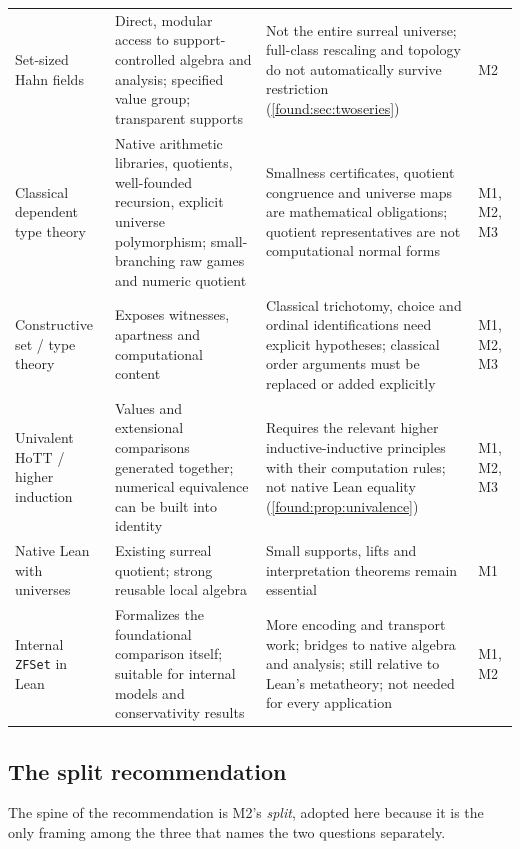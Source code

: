 \documentclass[11pt,letterpaper]{article}
\numberwithin{equation}{section}
\theoremstyle{definition}
\theoremstyle{remark}
\begin{document}
\begin{longtable}{@{}P{0.17\textwidth}P{0.30\textwidth}P{0.34\textwidth}P{0.10\textwidth}@{}}
Set-sized Hahn fields & Direct, modular access to support-controlled algebra and analysis; specified value group; transparent supports & Not the entire surreal universe; full-class rescaling and topology do not automatically survive restriction (\cref{found:sec:twoseries}) & M2\\[0.5em]
Classical dependent type theory & Native arithmetic libraries, quotients, well-founded recursion, explicit universe polymorphism; small-branching raw games and numeric quotient & Smallness certificates, quotient congruence and universe maps are mathematical obligations; quotient representatives are not computational normal forms & M1, M2, M3\\[0.5em]
Constructive set / type theory & Exposes witnesses, apartness and computational content & Classical trichotomy, choice and ordinal identifications need explicit hypotheses; classical order arguments must be replaced or added explicitly & M1, M2, M3\\[0.5em]
Univalent HoTT / higher induction & Values and extensional comparisons generated together; numerical equivalence can be built into identity & Requires the relevant higher inductive-inductive principles with their computation rules; not native Lean equality (\cref{found:prop:univalence}) & M1, M2, M3\\[0.5em]
Native Lean with universes & Existing surreal quotient; strong reusable local algebra & Small supports, lifts and interpretation theorems remain essential & M1\\[0.5em]
Internal \texttt{ZFSet} in Lean & Formalizes the foundational comparison itself; suitable for internal models and conservativity results & More encoding and transport work; bridges to native algebra and analysis; still relative to Lean's metatheory; not needed for every application & M1, M2\\
\bottomrule
\end{longtable}

\subsection{The split recommendation}
\label{found:sub:split}
The spine of the recommendation is M2's \emph{split}, adopted here because it is
the only framing among the three that names the two questions separately.
\end{document}
